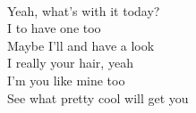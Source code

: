   \\
Yeah, what's  with it today? \\
I  to have one too \\
Maybe I'll  and have a look \\
I really  your hair, yeah \\
I'm  you like mine too \\
See what  pretty cool will get you \\


